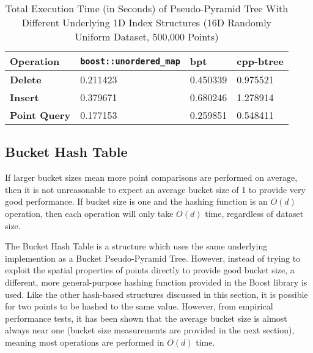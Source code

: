 \begin{table}
	\centering
	\begin{tabular}{|l|l|l|l|}
		\hline
		\textbf{Operation} & \texttt{boost::unordered\_map} & bpt & cpp-btree  \\
		\hline
		\textbf{Delete} & 0.211423 & 0.450339 & 0.975521 \\
		\textbf{Insert} & 0.379671 & 0.680246 & 1.278914 \\
		\textbf{Point Query} & 0.177153 & 0.259851 & 0.548411 \\
		\hline
	\end{tabular}
	\caption{Total Execution Time (in Seconds) of Pseudo-Pyramid Tree With Different Underlying 1D Index Structures (16D Randomly Uniform Dataset, 500,000 Points)}
	\label{tab:hashtable-bplus-time-comparison}
\end{table}

\subsection{Bucket Hash Table}
\label{sec:bucket-hash-table}


If larger bucket sizes mean more point comparisons are performed on average, then it is not unreasonable to expect an average bucket size of 1 to provide very good performance. If bucket size is one and the hashing function is an $O(d)$ operation, then each operation will only take $O(d)$ time, regardless of dataset size.

The Bucket Hash Table is a structure which uses the same underlying implemention as a Bucket Pseudo-Pyramid Tree. However, instead of trying to exploit the spatial properties of points directly to provide good bucket size, a different, more general-purpose hashing function provided in the Boost library is used. Like the other hash-based structures discussed in this section, it is possible for two points to be hashed to the same value. However, from empirical performance tests, it has been shown that the average bucket size is almost always near one (bucket size measurements are provided in the next section), meaning most operations are performed in $O(d)$ time.

